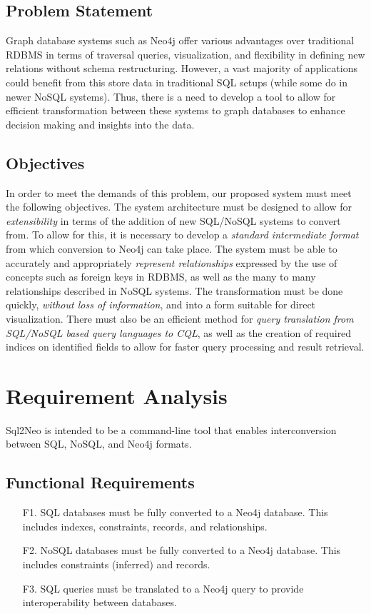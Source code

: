 \documentclass[12pt]{article}
\newcommand{\sectionfontstyle}{\fontsize{16pt}{1em}\usefont{T1}{phv}{b}{n}}
\begin{document}
    \subsection{Problem Statement}
    Graph database systems such as Neo4j offer various advantages over traditional RDBMS in terms of traversal queries, visualization, and flexibility in defining new relations without schema restructuring. However, a vast majority of applications could benefit from this store data in traditional SQL setups (while some do in newer NoSQL systems). Thus, there is a need to develop a tool to allow for efficient transformation between these systems to graph databases to enhance decision making and insights into the data.

    \subsection{Objectives}
    In order to meet the demands of this problem, our proposed system must meet the following objectives. The system architecture must be designed to allow for \textit{extensibility} in terms of the addition of new SQL/NoSQL systems to convert from. To allow for this, it is necessary to develop a \textit{standard intermediate format} from which conversion to Neo4j can take place. The system must be able to accurately and appropriately \textit{represent relationships} expressed by the use of concepts such as foreign keys in RDBMS, as well as the many to many relationships described in NoSQL systems. The transformation must be done quickly, \textit{without loss of information}, and into a form suitable for direct visualization. There must also be an efficient method for \textit{query translation from SQL/NoSQL based query languages to CQL}, as well as the creation of required indices on identified fields to allow for faster query processing and result retrieval.

    \newpage

    \section{\sectionfontstyle Requirement Analysis}
    Sql2Neo is intended to be a command-line tool that enables interconversion between SQL, NoSQL, and Neo4j formats.

    \subsection{Functional Requirements}
    \begin{enumerate}
        \item [F1.] SQL databases must be fully converted to a Neo4j database. This includes indexes, constraints, records, and relationships.
        \item [F2.] NoSQL databases must be fully converted to a Neo4j database. This includes constraints (inferred) and records.
        \item [F3.] SQL queries must be translated to a Neo4j query to provide interoperability between databases.
    \end{enumerate}
\end{document}
